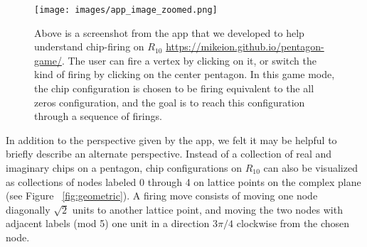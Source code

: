 \documentclass[12p]{amsart}
\numberwithin{equation}{section}
\theoremstyle{plain}
\theoremstyle{definition}
\begin{document}
\begin{figure}
    \centering
    \texttt{[image: images/app\_image\_zoomed.png]}
    \caption{Above is a screenshot from the app that we developed to help understand chip-firing on $R_{10}$ \url{https://mikeion.github.io/pentagon-game/}. The user can fire a vertex by clicking on it, or switch the kind of firing by clicking on the center pentagon. In this game mode, the chip configuration is chosen to be firing equivalent to the all zeros configuration, and the goal is to reach this configuration through a sequence of firings. }
    \label{fig:app_example}
\end{figure}

In addition to the perspective given by the app, we felt it may be helpful to briefly describe an alternate perspective. Instead of a collection of real and imaginary chips on a pentagon, chip configurations on $R_{10}$ can also be visualized as collections of nodes labeled 0 through 4 on lattice points on the complex plane (see Figure ~\ref{fig:geometric}). A firing move consists of moving one node diagonally $\sqrt2$ units to another lattice point, and moving the two nodes with adjacent labels (mod 5) one unit in a direction $3\pi/4$ clockwise from the chosen node. 
\end{document}
